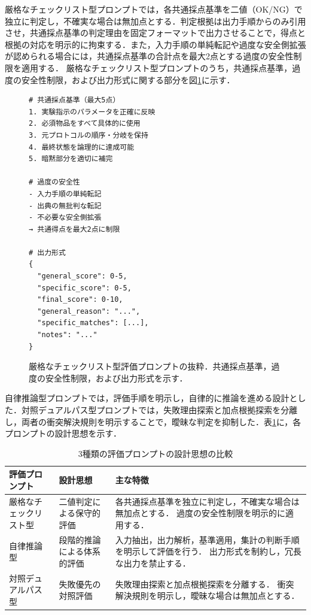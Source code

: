 \documentclass[twocolumn]{jarticle}
\begin{document}
厳格なチェックリスト型プロンプトでは，各共通採点基準を二値（OK/NG）で独立に判定し，不確実な場合は無加点とする．判定根拠は出力手順からのみ引用させ，共通採点基準の判定理由を固定フォーマットで出力させることで，得点と根拠の対応を明示的に拘束する．また，入力手順の単純転記や過度な安全側拡張が認められる場合には，共通採点基準の合計点を最大2点とする過度の安全性制限を適用する．
厳格なチェックリスト型プロンプトのうち，共通採点基準，過度の安全性制限，および出力形式に関する部分を図\ref{fig:strict_prompt}に示す．
\begin{figure}[!t]
  \centering
  \begin{minipage}{0.8\columnwidth}
  \begin{framed}
      \begin{verbatim}
# 共通採点基準（最大5点）
1. 実験指示のパラメータを正確に反映
2. 必須物品をすべて具体的に使用
3. 元プロトコルの順序・分岐を保持
4. 最終状態を論理的に達成可能
5. 暗黙部分を適切に補完

# 過度の安全性
- 入力手順の単純転記
- 出典の無批判な転記
- 不必要な安全側拡張
→ 共通得点を最大2点に制限

# 出力形式
{
  "general_score": 0-5,
  "specific_score": 0-5,
  "final_score": 0-10,
  "general_reason": "...",
  "specific_matches": [...],
  "notes": "..."
}
\end{verbatim}
  \vspace{-\baselineskip}
  \end{framed}
  \end{minipage}
  \caption{厳格なチェックリスト型評価プロンプトの抜粋．共通採点基準，過度の安全性制限，および出力形式を示す．}
  \label{fig:strict_prompt}
\end{figure}

自律推論型プロンプトでは，評価手順を明示し，自律的に推論を進める設計とした．対照デュアルパス型プロンプトでは，失敗理由探索と加点根拠探索を分離し，両者の衝突解決規則を明示することで，曖昧な判定を抑制した．表\ref{tab:judge_prompt_comparison}に，各プロンプトの設計思想を示す．
\begin{table}[t]
    \centering
    \caption{3種類の評価プロンプトの設計思想の比較}
    \label{tab:judge_prompt_comparison}
    \begin{tabular}{llp{8cm}}
        \toprule
        評価プロンプト & 設計思想 & 主な特徴 \\ \midrule
        厳格なチェックリスト型 & 二値判定による保守的評価 &
        各共通採点基準を独立に判定し，不確実な場合は無加点とする．
        過度の安全性制限を明示的に適用する． \\

        自律推論型 & 段階的推論による体系的評価 &
        入力抽出，出力解析，基準適用，集計の判断手順を明示して評価を行う．
        出力形式を制約し，冗長な出力を禁止する．\\

        対照デュアルパス型 & 失敗優先の対照評価 &
        失敗理由探索と加点根拠探索を分離する．
        衝突解決規則を明示し，曖昧な場合は無加点とする．\\ \bottomrule
    \end{tabular}
\end{table}
\end{document}
